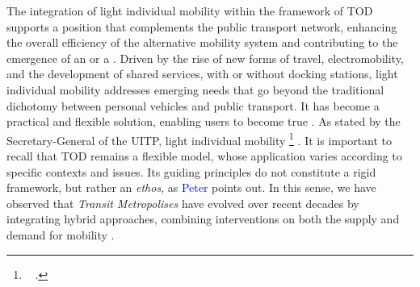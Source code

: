 \begin{refsegment}
The integration of light individual mobility within the framework of \acrshort{TOD} supports a position that complements the public transport network, enhancing the overall efficiency of the alternative mobility system and contributing to the emergence of an  or a  \textcolor{blue}{\autocite[2]{schultz_micromobility_2019}}. Driven by the rise of new forms of travel, electromobility, and the development of shared services, with or without docking stations, light individual mobility addresses emerging needs that go beyond the traditional dichotomy between personal vehicles and public transport. It has become a practical and flexible solution, enabling users to become true  \textcolor{blue}{\autocite[1]{boffi_extrait_2019}}. As stated by the Secretary-General of the \acrfull{UITP}, light individual mobility  \footnote{~
     \textcolor{blue}{\autocite{bcg_role_2020}}.
} \textcolor{blue}{\autocite{bcg_role_2020}}. It is important to recall that \acrshort{TOD} remains a flexible model, whose application varies according to specific contexts and issues. Its guiding principles do not constitute a rigid framework, but rather an \textsl{ethos}, as \textcolor{blue}{Peter} \textcolor{blue}{\textcite[11]{calthorpe_next_1993}} points out. In this sense, we have observed that \textsl{Transit Metropolises} have evolved over recent decades by integrating hybrid approaches, combining interventions on both the supply and demand for mobility \textcolor{blue}{\autocite[137-143]{cervero_transit_2020}}.%


\end{refsegment}

